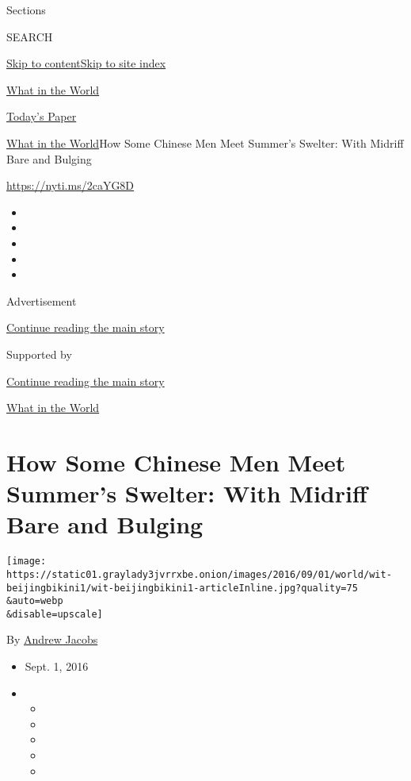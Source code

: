 Sections

SEARCH

\protect\hyperlink{site-content}{Skip to
content}\protect\hyperlink{site-index}{Skip to site index}

\href{https://www.nytimes3xbfgragh.onion/column/what-in-the-world}{What
in the World}

\href{https://myaccount.nytimes3xbfgragh.onion/auth/login?response_type=cookie\&client_id=vi}{}

\href{https://www.nytimes3xbfgragh.onion/section/todayspaper}{Today's
Paper}

\href{/column/what-in-the-world}{What in the World}\textbar{}How Some
Chinese Men Meet Summer's Swelter: With Midriff Bare and Bulging

\url{https://nyti.ms/2caYG8D}

\begin{itemize}
\item
\item
\item
\item
\item
\end{itemize}

Advertisement

\protect\hyperlink{after-top}{Continue reading the main story}

Supported by

\protect\hyperlink{after-sponsor}{Continue reading the main story}

\href{/column/what-in-the-world}{What in the World}

\hypertarget{how-some-chinese-men-meet-summers-swelter-with-midriff-bare-and-bulging}{%
\section{How Some Chinese Men Meet Summer's Swelter: With Midriff Bare
and
Bulging}\label{how-some-chinese-men-meet-summers-swelter-with-midriff-bare-and-bulging}}

\texttt{[image: https://static01.graylady3jvrrxbe.onion/images/2016/09/01/world/wit-beijingbikini1/wit-beijingbikini1-articleInline.jpg?quality=75\\\&auto=webp\\\&disable=upscale]}

By \href{http://www.nytimes3xbfgragh.onion/by/andrew-jacobs}{Andrew
Jacobs}

\begin{itemize}
\item
  Sept. 1, 2016
\item
  \begin{itemize}
  \item
  \item
  \item
  \item
  \item
  \end{itemize}
\end{itemize}

